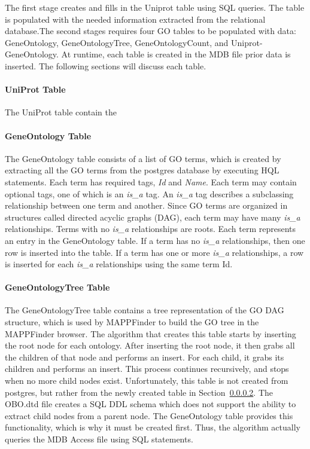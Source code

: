 The first stage creates and fills in the Uniprot table using SQL queries.  The table is populated with the needed information extracted from the relational database.The second stages requires four GO tables to be populated with data: GeneOntology, GeneOntologyTree, GeneOntologyCount, and Uniprot-GeneOntology. At runtime, each table is created in the MDB file prior data is inserted. The following sections will discuss each table.


\paragraph{UniProt Table}
\label{uniprottable}
The UniProt table contain the 

\paragraph{GeneOntology Table}
\label{gotable}
The GeneOntology table consists of a list of GO terms, which is created by extracting all the
GO terms from the postgres database by executing HQL statements. Each term has required tags, \emph{Id} and \emph{Name}.
Each term may contain optional tags, one of which is an \emph{is\_a} tag. An \emph{is\_a} tag describes a
subclassing relationship between one term and another. Since GO terms
are organized in structures called directed acyclic graphs (DAG), each term may have many \emph{is\_a} relationships.
Terms with no \emph{is\_a} relationships are roots. Each term represents an entry in the GeneOntology table. If a term
has no \emph{is\_a} relationships, then one row is inserted into the table. If a term has one or more
\emph{is\_a} relationships, a row is inserted for each \emph{is\_a} relationships using the same term Id.


\paragraph{GeneOntologyTree Table}
The GeneOntologyTree table contains a tree representation of the GO DAG structure, which is used by MAPPFinder
to build the GO tree in the MAPPFinder browser. The algorithm that creates this table starts by inserting the root
node for each ontology. After inserting the root node, it then grabs all the children of that node and performs an insert.
For each child, it grabs its children
and performs an insert. This process continues recursively, and stops when no more child nodes exist.
Unfortunately, this table is not created from postgres, but rather from the
newly created table in Section~\ref{gotable}. The OBO.dtd file creates a SQL DDL schema which does not support
the ability to extract child nodes from a parent node. The GeneOntology table provides this functionality, which
is why it must be created first. Thus, the algorithm actually queries the MDB Access file using SQL statements.


